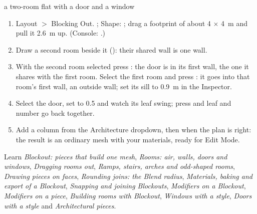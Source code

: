 \begin{example}{a two-room flat with a door and a window}
\begin{enumerate}
  \item Layout $>$ Blocking Out. ; Shape: ; drag a footprint of about 4 $\times$ 4~m and pull it 2.6~m
    up. (Console: .)
  \item Draw a second room beside it (): their shared wall
    is one wall.
  \item With the second room selected press : the door is in its first wall, the one it shares with the first room.
    Select the first room and press : it goes into that room's first wall, an outside wall; set its sill to 0.9~m in the Inspector.
  \item Select the door, set  to 0.5 and watch its leaf swing; press  and leaf and number go back
    together.
  \item Add a column from the Architecture dropdown, then  when the plan is right: the result is an
    ordinary mesh with your materials, ready for Edit Mode.
\end{enumerate}
\end{example}

\begin{fromnote}{Learn}
\emph{Blockout: pieces that build one mesh}, \emph{Rooms: air, walls, doors and windows}, \emph{Dragging rooms out},
\emph{Ramps, stairs, arches and odd-shaped rooms}, \emph{Drawing pieces on faces}, \emph{Rounding joins: the Blend radius},
\emph{Materials, baking and export of a Blockout}, \emph{Snapping and joining Blockouts}, \emph{Modifiers on a Blockout},
\emph{Modifiers on a piece}, \emph{Building rooms with Blockout}, \emph{Windows with a style}, \emph{Doors with a style} and
\emph{Architectural pieces}.
\end{fromnote}


